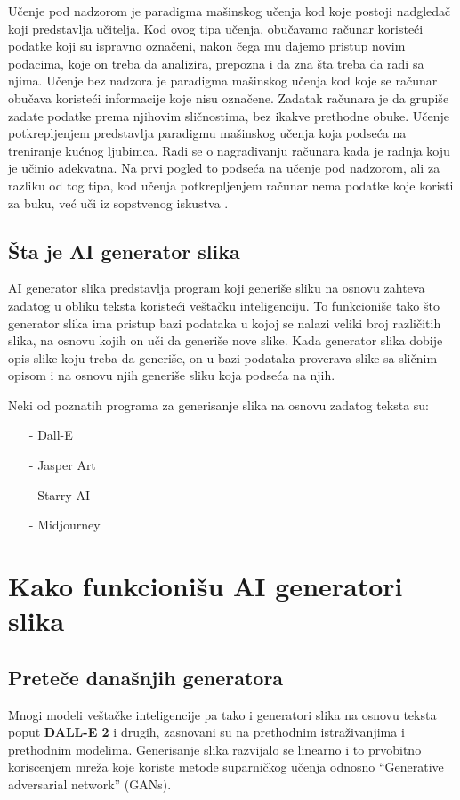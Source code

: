\documentclass[12pt, letterpaper]{article}
\begin{document}
  

Učenje pod nadzorom je paradigma mašinskog učenja kod koje postoji nadgledač koji predstavlja učitelja. Kod ovog tipa učenja, obučavamo računar koristeći podatke koji su ispravno označeni, nakon čega mu dajemo pristup novim podacima, koje on treba da analizira, prepozna i da zna šta treba da radi sa njima. Učenje bez nadzora je paradigma mašinskog učenja kod koje se računar obučava koristeći informacije koje nisu označene. Zadatak računara je da grupiše zadate podatke prema njihovim sličnostima, bez ikakve prethodne obuke. Učenje potkrepljenjem predstavlja paradigmu mašinskog učenja koja podseća na treniranje kućnog ljubimca. Radi se o nagrađivanju računara kada je radnja koju je učinio adekvatna. Na prvi pogled to podseća na učenje pod nadzorom, ali za razliku od tog tipa, kod učenja potkrepljenjem računar nema podatke koje koristi za buku, već uči iz sopstvenog iskustva \cite{kljucDva}. 

  

\subsection*{Šta je AI generator slika} 

AI generator slika predstavlja program koji generiše sliku na osnovu zahteva zadatog u obliku teksta koristeći veštačku inteligenciju. To funkcioniše tako što generator slika ima pristup bazi podataka u kojoj se nalazi veliki broj različitih slika, na osnovu kojih on uči da generiše nove slike. Kada generator slika dobije opis slike koju treba da generiše, on u bazi podataka proverava slike sa sličnim opisom i na osnovu njih generiše sliku koja podseća na njih.    

Neki od poznatih programa za generisanje slika na osnovu zadatog teksta su: 

\begin{itemize} 
\item[-] Dall-E  
\item[-] Jasper Art
\item[-] Starry AI 
\item[-] Midjourney
 
\end{itemize} 

\section{Kako funkcionišu AI generatori slika}
\subsection*{Preteče današnjih generatora}
Mnogi modeli veštačke inteligencije pa tako i generatori slika na osnovu teksta poput \textbf{DALL-E 2} i drugih, zasnovani su na prethodnim istraživanjima i prethodnim modelima.
Generisanje slika razvijalo se linearno i to prvobitno koriscenjem mreža koje koriste metode suparničkog učenja odnosno “Generative adversarial network” (GANs).
\end{document}
